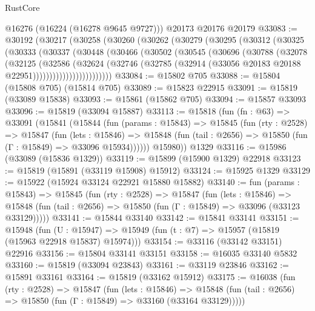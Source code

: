 \begin{lexlean}{RustCore}
\begin{coremodule}
      @16276
      (@16224 (@16278 @9645 @9727)))
    @20173
    @20176
    @20179
@33083 := @30192
    (@30217
      (@30258
        (@30260
          (@30262
            (@30279
              (@30295
                (@30312
                  (@30325
                    (@30333
                      (@30337
                        (@30448
                          (@30466
                            (@30502
                              (@30545
                                (@30696
                                  (@30788
                                    (@32078
                                      (@32125
                                        (@32586
                                          (@32624
                                            (@32746
                                              (@32785
                                                (@32914
                                                  (@33056
                                                    @20183
                                                    @20188
                                                    @22951))))))))))))))))))))))))
@33084 := @15802 @705
@33088 := @15804 (@15808 @705) (@15814 @705)
@33089 := @15823 @22915
@33091 := @15819 (@33089 @15838)
@33093 := @15861 (@15862 @705)
@33094 := @15857 @33093
@33096 := @15819 (@33094 @15887)
@33113 := @15818
    (fun (fn : @63) =>
    @33091
      (@15841
        (@15844
          (fun (params : @15843) =>
          @15845
            (fun (rty : @2528) =>
            @15847
              (fun (lets : @15846) =>
              @15848 (fun (tail : @2656) => @15850 (fun (Γ : @15849) => @33096 @15934))))))
        @15980))
    @1329
@33116 := @15986 (@33089 (@15836 @1329))
@33119 := @15899 (@15900 @1329) @22918
@33123 := @15819 (@15891 (@33119 @15908) @15912)
@33124 := @15925 @1329
@33129 := @15922 (@15924 @33124 @22921 @15880 @15882)
@33140 := fun (params : @15843) =>
  @15845
    (fun (rty : @2528) =>
    @15847
      (fun (lets : @15846) =>
      @15848 (fun (tail : @2656) => @15850 (fun (Γ : @15849) => @33096 (@33123 @33129)))))
@33141 := @15844 @33140
@33142 := @15841 @33141
@33151 := @15948
    (fun (U : @15947) => @15949 (fun (t : @7) => @15957 (@15819 (@15963 @22918 @15837) @15974)))
@33154 := @33116 (@33142 @33151) @22916
@33156 := @15804 @33141 @33151
@33158 := @16035 @33140 @5832
@33160 := @15819 (@33094 @23843)
@33161 := @33119 @23846
@33162 := @15891 @33161
@33164 := @15819 (@33162 @15912)
@33175 := @16038
    (fun (rty : @2528) =>
    @15847
      (fun (lets : @15846) =>
      @15848 (fun (tail : @2656) => @15850 (fun (Γ : @15849) => @33160 (@33164 @33129)))))

\end{coremodule}
\end{lexlean}
